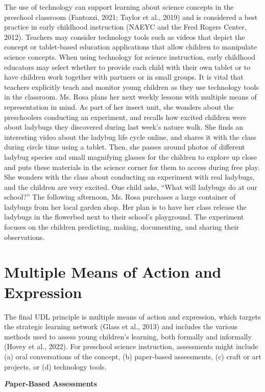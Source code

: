 \documentclass[11.5pt]{sig-alternate}
\begin{document}
\begin{large}
The use of technology can support learning about science concepts in the preschool classroom (Fantozzi, 2021; Taylor et al., 2019) and is considered a best practice in early childhood instruction (NAEYC and the Fred Rogers Center, 2012). Teachers may consider technology tools such as videos that depict the concept or tablet-based education applications that allow children to manipulate science concepts. When using technology for science instruction, early childhood educators may select whether to provide each child with their own tablet or to have children work together with partners or in small groups. It is vital that teachers explicitly teach and monitor young children as they use technology tools in the classroom.
Ms. Rosa plans her next weekly lessons with multiple means of representation in mind. As part of her insect unit, she wonders about the preschoolers conducting an experiment, and recalls how excited children were about ladybugs they discovered during last week’s nature walk. She finds an interesting video about the ladybug life cycle online, and shares it with the class during circle time using a tablet. Then, she passes around photos of different ladybug species and small magnifying glasses for the children to explore up close and puts these materials in the science corner for them to access during free play.  She wonders with the class about conducting an experiment with real ladybugs, and the children are very excited. One child asks, “What will ladybugs do at our school?” The following afternoon, Ms. Rosa purchases a large container of ladybugs from her local garden shop. Her plan is to have her class release the ladybugs in the flowerbed next to their school’s playground. The experiment focuses on the children predicting, making, documenting, and sharing their observations.
\section*{Multiple Means of Action and Expression}
 
The final UDL principle is multiple means of action and expression, which targets the strategic learning network (Glass et al., 2013) and includes the various methods used to assess young children’s learning, both formally and informally (Hovey et al., 2022). For preschool science instruction, assessments might include (a) oral conversations of the concept, (b) paper-based assessments, (c) craft or art projects, or (d) technology tools.   

\textbf{\emph Paper-Based Assessments }


\end{large}
\end{document}
